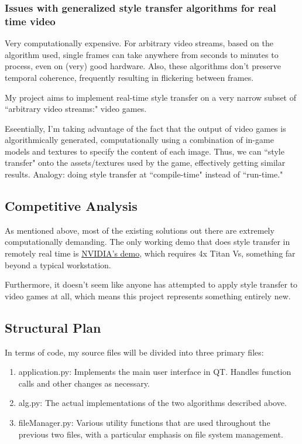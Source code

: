 \documentclass[12pt]{article}
\begin{document}
    \subsubsection{Issues with generalized style transfer algorithms for real time video}
    
    Very computationally expensive. For arbitrary video streams, based on the algorithm used, single frames can take anywhere from seconds to minutes to process, even on (very) good hardware.
    Also, these algorithms don't preserve temporal coherence, frequently resulting in flickering between frames. 

    My project aims to implement real-time style transfer on a very narrow subset of ``arbitrary video streams:" video games.

    Eseentially, I'm taking advantage of the fact that the output of video games is algorithmically generated, computationally using a combination of in-game models and textures to specify the content of each image.
    Thus, we can ``style transfer" onto the assets/textures used by the game, effectively getting similar results. 
    Analogy: doing style transfer at ``compile-time" instead of ``run-time."

\subsection{Competitive Analysis}
    As mentioned above, most of the existing solutions out there are extremely computationally demanding.
    The only working demo that does style transfer in remotely real time is \href{https://www.youtube.com/watch?v=vAelubuwquE}{NVIDIA's demo}, which requires 4x Titan Vs, something far beyond a typical workstation.
    
    Furthermore, it doesn't seem like anyone has attempted to apply style transfer to video games at all, which means this project represents something entirely new.
\subsection{Structural Plan}
    In terms of code, my source files will be divided into three primary files:
    \begin{enumerate}
        \item application.py: Implements the main user interface in QT. Handles function calls and other changes as necessary.
        \item alg.py: The actual implementations of the two algorithms described above.
        \item fileManager.py: Various utility functions that are used throughout the previous two files, with a particular emphasis on file system management.
    \end{enumerate}
\end{document}

